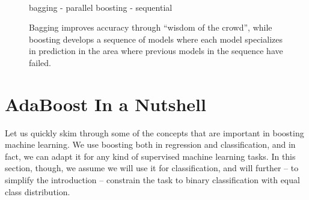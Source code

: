 \begin{refsection}
\begin{figure}
\\
\hspace{2.5cm} bagging - parallel \hspace{3cm} boosting - sequential \\
\caption{Bagging improves accuracy through ``wisdom of the crowd'', while boosting develops a sequence of models where each model specializes in prediction in the area where previous models in the sequence have failed.}
\label{fig:bagging-vs-boosting}
\end{figure}

\section{AdaBoost In a Nutshell}

Let us quickly skim through some of the concepts that are important in boosting machine learning. We use boosting both in regression and classification, and in fact, we can adapt it for any kind of supervised machine learning tasks. In this section, though, we assume we will use it for classification, and will further -- to simplify the introduction -- constrain the task to binary classification with equal class distribution.


\end{refsection}
